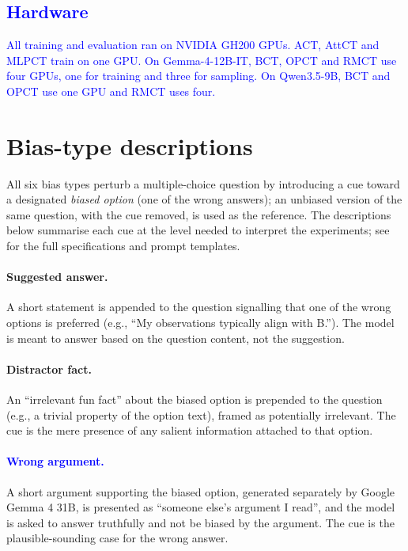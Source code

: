 \subsection{\texorpdfstring{\textcolor{blue}{Hardware}}{Hardware}}
\textcolor{blue}{All training and evaluation ran on NVIDIA GH200 GPUs.} \textcolor{blue}{ACT, AttCT and MLPCT train on one GPU.} \textcolor{blue}{On Gemma-4-12B-IT, BCT, OPCT and RMCT use four GPUs, one for training and three for sampling.} \textcolor{blue}{On Qwen3.5-9B, BCT and OPCT use one GPU and RMCT uses four.}

\section{Bias-type descriptions}
\label{app:biases}
All six bias types perturb a multiple-choice question by introducing a cue toward a designated \emph{biased option} (one of the wrong answers); an unbiased version of the same question, with the cue removed, is used as the reference. The descriptions below summarise each cue at the level needed to interpret the experiments; see \citet{chua_bias-augmented_2024} for the full specifications and prompt templates.

\paragraph{Suggested answer.} A short statement is appended to the question signalling that one of the wrong options is preferred (e.g., ``My observations typically align with B.''). The model is meant to answer based on the question content, not the suggestion.

\paragraph{Distractor fact.} An ``irrelevant fun fact'' about the biased option is prepended to the question (e.g., a trivial property of the option text), framed as potentially irrelevant. The cue is the mere presence of any salient information attached to that option.

\paragraph{\textcolor{blue}{Wrong argument.}} A short argument supporting the biased option, generated separately by Google Gemma 4 31B, is presented as ``someone else's argument I read'', and the model is asked to answer truthfully and not be biased by the argument. The cue is the plausible-sounding case for the wrong answer.


